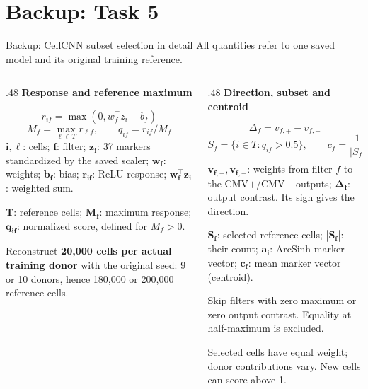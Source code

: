 \documentclass[aspectratio=169,10pt]{beamer}
\newcommand{\eyebrow}[1]{{\color{Teal}\bfseries #1}\par\smallskip}
\newcommand{\compactmath}{%
  \setlength{\abovedisplayskip}{4pt}\setlength{\belowdisplayskip}{4pt}%
  \setlength{\abovedisplayshortskip}{2pt}\setlength{\belowdisplayshortskip}{4pt}}
\begin{document}
\section{Backup: Task 5}
\begin{frame}{Backup: CellCNN subset selection in detail}
  \small\compactmath
  {\small All quantities refer to one saved model and its original training reference.}\par\medskip
  \begin{columns}[T,onlytextwidth]
    \begin{column}{.48\textwidth}
      \eyebrow{Response and reference maximum}
      \[r_{if}=\max(0,w_f^\top z_i+b_f)\]
      \[M_f=\max_{\ell\in T}r_{\ell f},\qquad q_{if}=r_{if}/M_f\]
      {\scriptsize $\boldsymbol{i,\ell}$: cells; $\boldsymbol{f}$: filter; $\boldsymbol{z_i}$: 37 markers standardized by the saved scaler; $\boldsymbol{w_f}$: weights; $\boldsymbol{b_f}$: bias; $\boldsymbol{r_{if}}$: ReLU response; $\boldsymbol{w_f^\top z_i}$: weighted sum.}\par\smallskip
      {\scriptsize $\boldsymbol{T}$: reference cells; $\boldsymbol{M_f}$: maximum response; $\boldsymbol{q_{if}}$: normalized score, defined for $M_f>0$.}\par\medskip
      \small Reconstruct \textbf{20,000 cells per actual training donor} with the original seed: 9 or 10 donors, hence 180,000 or 200,000 reference cells.
    \end{column}
    \begin{column}{.48\textwidth}
      \eyebrow{Direction, subset and centroid}
      \[\Delta_f=v_{f,+}-v_{f,-}\]
      \[S_f=\{i\in T:q_{if}>0.5\},\qquad
        c_f=\frac{1}{|S_f|}\sum_{i\in S_f}a_i\]
      {\scriptsize $\boldsymbol{v_{f,+},v_{f,-}}$: weights from filter $f$ to the CMV$+$/CMV$-$ outputs; $\boldsymbol{\Delta_f}$: output contrast. Its sign gives the direction.}\par\smallskip
      {\scriptsize $\boldsymbol{S_f}$: selected reference cells; $\boldsymbol{|S_f|}$: their count; $\boldsymbol{a_i}$: ArcSinh marker vector; $\boldsymbol{c_f}$: mean marker vector (centroid).}\par\medskip
      \small Skip filters with zero maximum or zero output contrast. Equality at half-maximum is excluded.\par\smallskip
      {\scriptsize Selected cells have equal weight; donor contributions vary. New cells can score above 1.}
    \end{column}
  \end{columns}
\end{frame}
\end{document}
